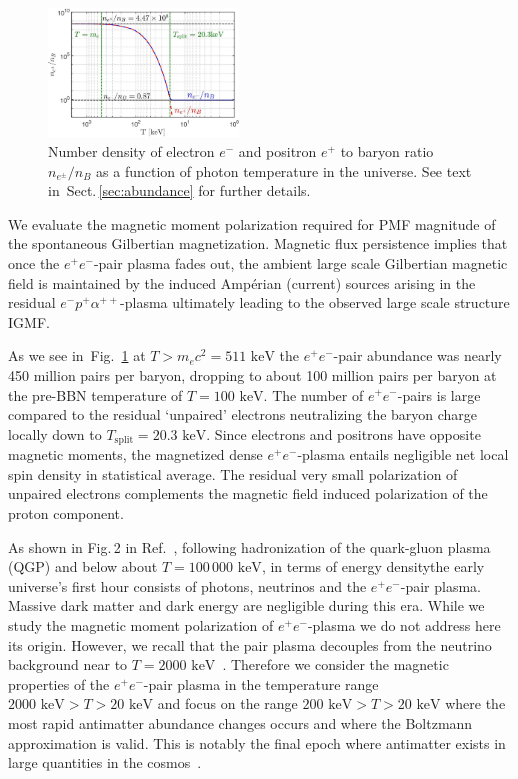 \documentclass[aps,prd,floatfix,reprint]{revtex4-2}
\newcommand*{\keV}{\text{ keV}}
\newcommand{\rf}[1]{Fig.~{\ref{#1}}}
\newcommand{\rsec}[1]{Sect.\,{\ref{#1}}}
\begin{document}
\begin{figure}[ht]
 \centering
\includegraphics[width=0.45\textwidth]{plots/EEPlasmaDensityRatio_new01.jpg}
 \caption{Number density of electron $e^{-}$ and positron $e^{+}$ to baryon ratio $n_{e^{\pm}}/n_{B}$ as a function of photon temperature in the universe. See text in~\rsec{sec:abundance} for further details.}
 \label{fig:densityratio} 
\end{figure}

We evaluate the magnetic moment polarization required for PMF magnitude of the spontaneous Gilbertian magnetization. Magnetic flux persistence implies that once the $e^{+}e^{-}$-pair plasma fades out, the ambient large scale Gilbertian magnetic field is maintained by the induced Amp\'erian (current) sources arising in the residual $e^{-}p^{+}\alpha^{++}$-plasma ultimately leading to the observed large scale structure IGMF. 

As we see in~\rf{fig:densityratio} at $T>m_ec^2=511\keV$ the $e^{+}e^{-}$-pair abundance was nearly 450 million pairs per baryon, dropping to about 100 million pairs per baryon at the pre-BBN temperature of $T=100\keV$. The number of $e^{+}e^{-}$-pairs is large compared to the residual `unpaired' electrons neutralizing the baryon charge locally down to $T_\mathrm{split}=20.3\keV$. Since electrons and positrons have opposite magnetic moments, the magnetized dense $e^{+}e^{-}$-plasma entails negligible net local spin density in statistical average. The residual very small polarization of unpaired electrons complements the magnetic field induced polarization of the proton component. 

As shown in Fig.\,2 in Ref.~\cite{Rafelski:2023emw}, following hadronization of the quark-gluon plasma (QGP) and below about $T\!=\!100\,000\keV$, in terms of energy densitythe early universe's first hour consists of photons, neutrinos and the $e^{+}e^{-}$-pair plasma. Massive dark matter and dark energy are negligible during this era. While we study the magnetic moment polarization of $e^{+}e^{-}$-plasma we do not address here its origin. However, we recall that the pair plasma decouples from the neutrino background near to $T=2000\keV$~\cite{Birrell:2014uka}. Therefore we consider the magnetic properties of the $e^{+}e^{-}$-pair plasma in the temperature range $2000\keV>T>20\keV$ and focus on the range $200\keV>T>20\keV$ where the most rapid antimatter abundance changes occurs and where the Boltzmann approximation is valid. This is notably the final epoch where antimatter exists in large quantities in the cosmos~\cite{Rafelski:2023emw}. 
\end{document}
